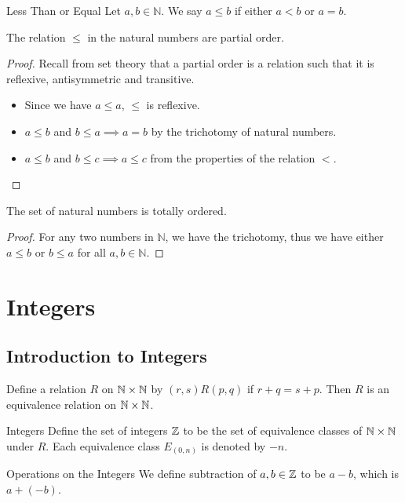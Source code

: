 \documentclass[a4paper]{article}
\begin{document}
\begin{defn}{Less Than or Equal}{} Let $a,b\in\mathbb{N}$. We say $a\leq b$ if either $a<b$ or $a=b$. 
\end{defn}

\begin{thm}{}{} The relation $\leq$ in the natural numbers are partial order. 
\end{thm}
\begin{proof} Recall from set theory that a partial order is a relation such that it is reflexive, antisymmetric and transitive. 
\begin{itemize}
\item Since we have $a\leq a$, $\leq$ is reflexive. 
\item $a\leq b$ and $b\leq a\implies a=b$ by the trichotomy of natural numbers. 
\item $a\leq b$ and $b\leq c\implies a\leq c$ from the properties of the relation $<$. 
\end{itemize}
\end{proof}

\begin{thm}{}{} The set of natural numbers is totally ordered. 
\end{thm}
\begin{proof} For any two numbers in $\mathbb{N}$, we have the trichotomy, thus we have either $a\leq b$ or $b\leq a$ for all $a,b\in\mathbb{N}$. 
\end{proof}

\pagebreak
\section{Integers}
\subsection{Introduction to Integers}
\begin{lmm}{}{} Define a relation $R$ on $\mathbb{N}\times\mathbb{N}$ by $(r,s)R(p,q)$ if $r+q=s+p$. Then $R$ is an equivalence relation on $\mathbb{N}\times\mathbb{N}$. 
\end{lmm}

\begin{defn}{Integers}{} Define the set of integers $\mathbb{Z}$ to be the set of equivalence classes of $\mathbb{N}\times\mathbb{N}$ under $R$. Each equivalence class $E_{(0,n)}$ is denoted by $-n$. 
\end{defn}

\begin{defn}{Operations on the Integers}{} We define subtraction of $a,b\in\mathbb{Z}$ to be $a-b$, which is $a+(-b)$. 
\end{defn}
\end{document}
